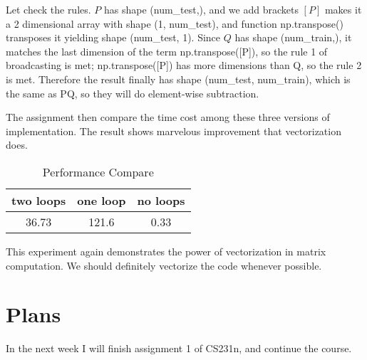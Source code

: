 \documentclass{article} %
\begin{document}
Let check the rules. $P$ has shape (num\_test,), and we add brackets $[P]$ makes it a 2 dimensional array with shape (1, num\_test), and function np.transpose() transposes it yielding shape (num\_test, 1). Since $Q$ has shape (num\_train,), it matches the last dimension of the term np.transpose([P]), so the rule 1 of broadcasting is met; np.transpose([P]) has more dimensions than Q, so the rule 2 is met. Therefore the result finally has shape (num\_test, num\_train), which is the same as PQ, so they will do element-wise subtraction.

The assignment then compare the time cost among these three versions of implementation. The result shows marvelous improvement that vectorization does.
\begin{table}[h]
\centering
\begin{tabular}{c|c|c}
\hline
two loops & one loop & no loops\\
\hline
36.73 & 121.6 & 0.33\\
\hline
\end{tabular}
\caption{Performance Compare}
\end{table}
This experiment again demonstrates the power of vectorization in matrix computation. We should definitely vectorize the code whenever possible.

\section{Plans}
In the next week I will finish assignment 1 of CS231n, and continue the course.
\end{document}
